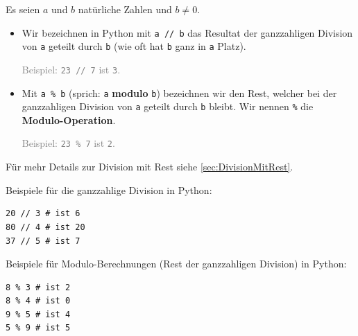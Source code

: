 \begin{mydefinition}
Es seien $a$ und $b$ natürliche Zahlen und $b\neq 0$.
\begin{itemize}
	\item Wir bezeichnen in Python mit \lstinline{a // b} das Resultat der ganzzahligen Division von \lstinline{a} geteilt durch \lstinline{b} (wie oft hat \lstinline{b} ganz in \lstinline{a} Platz).

	      \textcolor{Gray}{Beispiel: \texttt{23 // 7} ist \texttt{3}.}
	\item Mit \texttt{a \% b} (sprich: \texttt{a} \textbf{modulo} \texttt{b}) bezeichnen wir den Rest, welcher bei der ganzzahligen Division von \lstinline{a} geteilt durch \lstinline{b} bleibt. Wir nennen \texttt{\%} die \textbf{Modulo-Operation}.

	      \textcolor{Gray}{Beispiel: \texttt{23 \% 7} ist \texttt{2}.}
\end{itemize}
Für mehr Details zur Division mit Rest siehe \cref{sec:DivisionMitRest}.
\end{mydefinition}

\begin{myexample}
Beispiele für die ganzzahlige Division in Python:
\begin{lstlisting}
20 // 3 # ist 6
80 // 4 # ist 20
37 // 5 # ist 7
\end{lstlisting}
\end{myexample}

\begin{myexample}
Beispiele für Modulo-Berechnungen (Rest der ganzzahligen Division) in Python:
\begin{lstlisting}
8 % 3 # ist 2
8 % 4 # ist 0
9 % 5 # ist 4
5 % 9 # ist 5
\end{lstlisting}
\end{myexample}

